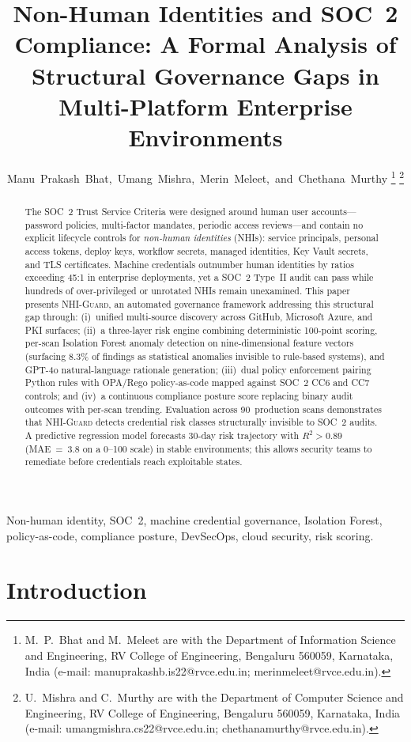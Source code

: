 \documentclass[journal]{IEEEtran}
\title{Non-Human Identities and SOC~2 Compliance: A Formal Analysis of Structural Governance Gaps in Multi-Platform Enterprise Environments}
\author{Manu~Prakash~Bhat,~Umang~Mishra,~Merin~Meleet,~and~Chethana~Murthy%
\thanks{M.~P.~Bhat and M.~Meleet are with the Department of Information Science and Engineering, RV College of Engineering, Bengaluru 560059, Karnataka, India (e-mail: manuprakashb.is22@rvce.edu.in; merinmeleet@rvce.edu.in).}%
\thanks{U.~Mishra and C.~Murthy are with the Department of Computer Science and Engineering, RV College of Engineering, Bengaluru 560059, Karnataka, India (e-mail: umangmishra.cs22@rvce.edu.in; chethanamurthy@rvce.edu.in).}}
\begin{document}
\maketitle

\begin{abstract}
The SOC~2 Trust Service Criteria were designed around human user accounts---password policies, multi-factor mandates, periodic access reviews---and contain no explicit lifecycle controls for \emph{non-human identities} (NHIs): service principals, personal access tokens, deploy keys, workflow secrets, managed identities, Key Vault secrets, and TLS certificates. Machine credentials outnumber human identities by ratios exceeding 45:1 in enterprise deployments, yet a SOC~2 Type~II audit can pass while hundreds of over-privileged or unrotated NHIs remain unexamined. This paper presents \textsc{NHI-Guard}, an automated governance framework addressing this structural gap through: (i)~unified multi-source discovery across GitHub, Microsoft Azure, and PKI surfaces; (ii)~a three-layer risk engine combining deterministic 100-point scoring, per-scan Isolation Forest anomaly detection on nine-dimensional feature vectors (surfacing 8.3\% of findings as statistical anomalies invisible to rule-based systems), and GPT-4o natural-language rationale generation; (iii)~dual policy enforcement pairing Python rules with OPA/Rego policy-as-code mapped against SOC~2 CC6 and CC7 controls; and (iv)~a continuous compliance posture score replacing binary audit outcomes with per-scan trending. Evaluation across 90~production scans demonstrates that \textsc{NHI-Guard} detects credential risk classes structurally invisible to SOC~2 audits. A predictive regression model forecasts 30-day risk trajectory with $R^{2} > 0.89$ (MAE~=~3.8 on a 0--100 scale) in stable environments; this allows security teams to remediate before credentials reach exploitable states.
\end{abstract}

\begin{IEEEkeywords}
Non-human identity, SOC~2, machine credential governance, Isolation Forest, policy-as-code, compliance posture, DevSecOps, cloud security, risk scoring.
\end{IEEEkeywords}

\section{Introduction}
\label{sec:intro}
\end{document}
